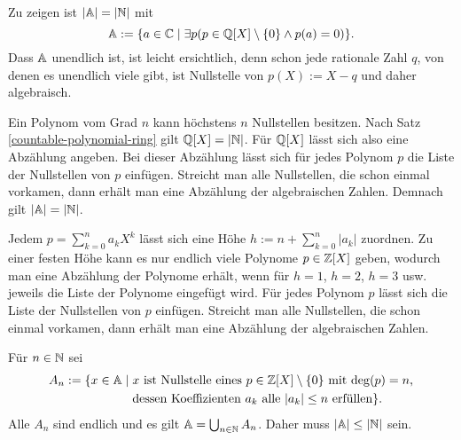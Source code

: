 \begin{Beweis}[Beweis 1]
Zu zeigen ist $|\mathbb A|=|\mathbb N|$ mit
\[\mathbb A := \{a\in\mathbb C\mid \exists p(p\in \mathbb Q[X]\setminus\{0\}\land p(a)=0)\}.\]
Dass $\mathbb A$ unendlich ist, ist leicht ersichtlich, denn schon jede
rationale Zahl $q$, von denen es unendlich viele gibt, ist Nullstelle
von $p(X):=X-q$ und daher algebraisch.

Ein Polynom vom Grad $n$ kann höchstens $n$ Nullstellen besitzen.
Nach Satz \ref{countable-polynomial-ring} gilt $\mathbb Q[X]=|\mathbb N|$.
Für $\mathbb Q[X]$ lässt sich also eine Abzählung angeben.
Bei dieser Abzählung lässt sich für jedes Polynom $p$ die Liste der
Nullstellen von $p$ einfügen. Streicht man alle Nullstellen, die schon
einmal vorkamen, dann erhält man eine Abzählung der algebraischen
Zahlen. Demnach gilt $|\mathbb A|=|\mathbb N|$.\,\qedsymbol
\end{Beweis}

\begin{Beweis}[Beweis 2]
Jedem $p=\sum_{k=0}^n a_kX^k$ lässt sich eine Höhe
$h:=n+\sum_{k=0}^n |a_k|$ zuordnen. Zu einer festen Höhe kann es nur
endlich viele Polynome $p\in\mathbb Z[X]$ geben, wodurch man eine Abzählung der
Polynome erhält, wenn für $h=1$, $h=2$, $h=3$ usw. jeweils die Liste
der Polynome eingefügt wird. Für jedes Polynom $p$ lässt sich die
Liste der Nullstellen von $p$ einfügen. Streicht man alle Nullstellen,
die schon einmal vorkamen, dann erhält man eine Abzählung der
algebraischen Zahlen.\,\qedsymbol
\end{Beweis}

\begin{Beweis}[Beweis 3]
Für $n\in\mathbb N$ sei
\[\begin{split}
A_n := \{x\in\mathbb A\mid \;&\text{$x$ ist Nullstelle eines
$p\in\mathbb Z[X]\setminus\{0\}$ mit $\deg(p)=n$,}\\
& \text{dessen Koeffizienten $a_k$ alle $|a_k|\le n$
erfüllen}\}.
\end{split}\]
Alle $A_n$ sind endlich und es gilt $\mathbb A=\bigcup_{n\in\mathbb N} A_n$.
Daher muss $|\mathbb A|\le |\mathbb N|$ sein.\,\qedsymbol
\end{Beweis}
